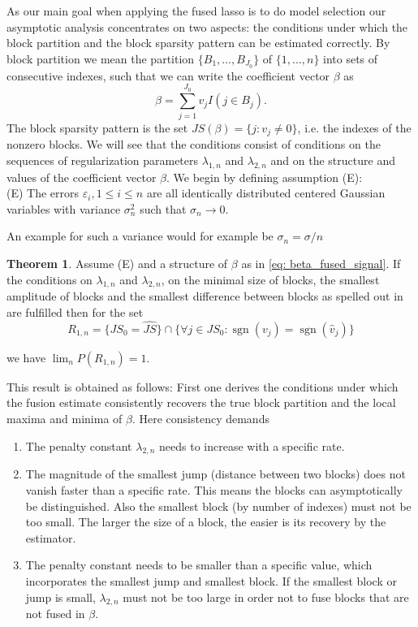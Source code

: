 \documentclass{article}
\theoremstyle{definition}
\newtheorem{theorem}{Theorem}
\DeclareMathOperator*{\sgn}{sgn}
\begin{document}
As our main goal when applying the fused lasso is to do model selection our asymptotic analysis concentrates on two aspects: the conditions under which the block partition and the block sparsity pattern can be estimated correctly. By block partition we mean the partition $\{B_1, \ldots, B_{J_0}\}$ of $\{1, \ldots, n\}$ into sets of consecutive indexes, such that we can write the coefficient vector $\beta$ as
\begin{equation}\label{eq: beta_fused_signal}
	\beta = \sum_{j=1}^{J_0} v_j I(j \in B_j).
\end{equation}
The block sparsity pattern is the set $JS(\beta) = \{j: v_j \neq 0\}$, i.e. the indexes of the nonzero blocks. We will see that the conditions consist of conditions on the sequences of regularization parameters $\lambda_{1,n}$ and $\lambda_{2,n}$ and on the structure and values of the coefficient vector $\beta$.
We begin by defining assumption (E): \\

\noindent (E) The errors $\varepsilon_i, 1 \leq i \leq n$ are all identically distributed centered Gaussian variables with variance $\sigma_n^2$ such that $\sigma_n \to 0$. \newline

\noindent An example for such a variance would for example be $\sigma_n = \sigma /n$ 


\begin{theorem}
	Assume (E) and a structure of $\beta$ as in \eqref{eq: beta_fused_signal}. If the conditions on $\lambda_{1,n}$ and $\lambda_{2,n}$, on the minimal size of blocks, the smallest amplitude of blocks and the smallest difference between blocks as spelled out in \citep{rinaldoproperties} are fulfilled then for the set
	\begin{equation}
		R_{1,n} = \{JS_0 = \hat{JS}\} \cap \{\forall j\in JS_0: \sgn(v_j) = \sgn(\hat{v}_j)\}
	\end{equation} 
	
	\noindent we have $\lim_n P(R_{1,n}) = 1$.
\end{theorem}
This result is obtained as follows: First one derives the conditions under which the fusion estimate consistently recovers the true block partition and the local maxima and minima of $\beta$. Here consistency demands 

\begin{enumerate}
	\item The penalty constant $\lambda_{2,n}$ needs to increase with a specific rate.
	\item The magnitude of the smallest jump (distance between two blocks) does not vanish faster than a specific rate. This means the blocks can asymptotically be distinguished. Also the smallest block (by number of indexes) must not be too small. The larger the size of a block, the easier is its recovery by the estimator.
	\item The penalty constant needs to be smaller than a specific value, which incorporates the smallest jump and smallest block. If the smallest block or jump is small, $\lambda_{2,n}$ must not be too large in order not to fuse blocks that are not fused in $\beta$. 
\end{enumerate} 
 
\end{document}
